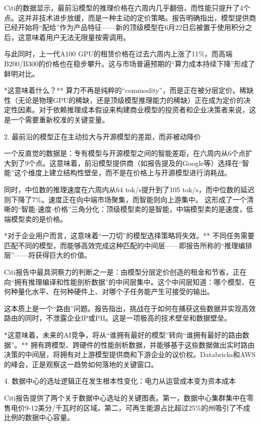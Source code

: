\documentclass[11pt]{ctexart}
\begin{document}
Citi的数据显示，最前沿模型的推理价格在六周内几乎翻倍，而性能只提升了4个点。这并非技术进步放缓，而是一种主动的定价策略。报告明确指出，模型提供商已经开始将“配给”作为产品特征——新的顶级模型在6月22日后被置于使用积分之后，这意味着用户无法无限量按需调用。

与此同时，上一代A100 GPU的租赁价格在过去六周内上涨了11\%，而高端B200/B300的价格也在稳步攀升。这与市场普遍预期的“算力成本持续下降”形成了鲜明对比。

*这意味着什么？** 算力不再是纯粹的“commodity”，而是正在被分层定价。稀缺性（无论是物理GPU的稀缺，还是顶级模型推理能力的稀缺）正在成为定价的决定性因素。对于依赖推理成本假设来构建商业模型的投资者和企业决策者来说，这是一个需要重新校准的关键变量。

2. 最前沿的模型正在主动拉大与开源模型的差距，而非被动降价

一个反直觉的数据是：专有模型与开源模型之间的智能差距，在六周内从6个点扩大到了9个点。这意味着，前沿模型提供商（如报告提及的Google等）选择在“智能”这个维度上建立结构性壁垒，而不是在价格上与开源模型进行消耗战。

同时，中位数的推理速度在六周内从64 tok/s提升到了105 tok/s，而中位数的延迟则下降了7\%。速度正在向中端市场聚集，而智能则向上游集中。 这形成了一个清晰的“智能-速度-价格”三角分化：顶级模型卖的是智能，中端模型卖的是速度，低端模型卖的是价格。

*对于企业用户而言，这意味着“一刀切”的模型选择策略将失效。** 不同任务需要匹配不同的模型，而能够高效完成这种匹配的中间层——即报告所称的“推理编排层”——将获得巨大的价值。

Citi报告中最具洞察力的判断之一是：由模型分层定价创造的租金和节省，正在向“拥有推理编译和性能剖析数据”的中间层集中。这个中间层知道：哪个模型、在何种量化水平、在何种硬件上、对哪个子任务能产生可接受的输出。

这本质上是一个“路由”问题。报告指出，挑战在于如何在捕获这些数据并实现高效路由的同时，不泄露企业IP或PII。这是一项极高的技术壁垒和数据壁垒。

*这意味着，未来的AI竞争，将从“谁拥有最好的模型”转向“谁拥有最好的路由数据”。** 拥有跨模型、跨硬件的性能剖析数据，并能够基于这些数据做出实时路由决策的中间层，将拥有对上游模型提供商和下游企业的议价权。Databricks和AWS的峰会，正是观察这一趋势如何落地的关键窗口。

4. 数据中心的选址逻辑正在发生根本性变化：电力从运营成本变为资本成本

Citi报告提供了两个关于数据中心选址的关键图表。第一，数据中心集群集中在零售电价9-12美分/千瓦时的区域。第二，可再生能源占比超过25\%的州吸引了不成比例的数据中心容量。
\end{document}
